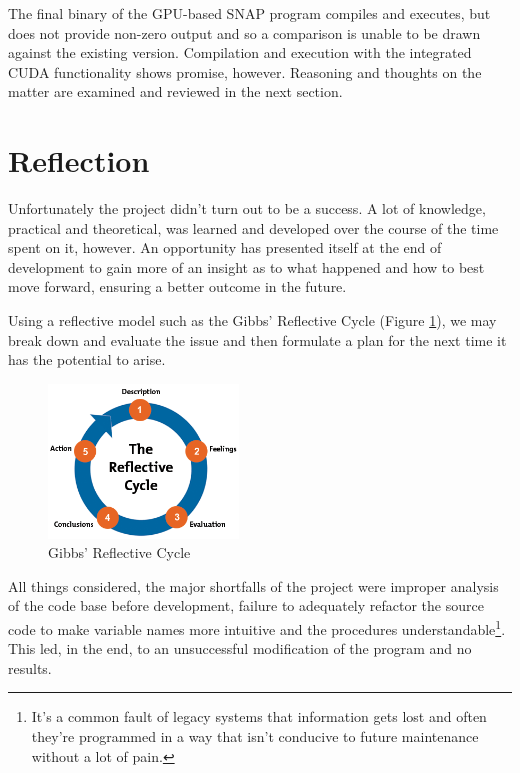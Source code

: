 \documentclass[conference]{IEEEtran}
\begin{document}
The final binary of the GPU-based SNAP program compiles and executes, but does not provide non-zero output and so a comparison is unable to be drawn against the existing version. Compilation and execution with the integrated CUDA functionality shows promise, however. Reasoning and thoughts on the matter are examined and reviewed in the next section.


\section{Reflection}
\label{sec:reflection}

Unfortunately the project didn't turn out to be a success. A lot of knowledge, practical and theoretical, was learned and developed over the course of the time spent on it, however. An opportunity has presented itself at the end of development to gain more of an insight as to what happened and how to best move forward, ensuring a better outcome in the future.

Using a reflective model such as the Gibbs' Reflective Cycle (Figure \ref{fig:gibbscycle}), we may break down and evaluate the issue and then formulate a plan for the next time it has the potential to arise.

\begin{figure}[!h]
    \centering
    \includegraphics[width=0.45\textwidth]{images/gibbs-cycle.png}
    \caption{Gibbs' Reflective Cycle}
    \label{fig:gibbscycle}
\end{figure}

All things considered, the major shortfalls of the project were improper analysis of the code base before development, failure to adequately refactor the source code to make variable names more intuitive and the procedures understandable\footnote{It's a common fault of legacy systems that information gets lost and often they're programmed in a way that isn't conducive to future maintenance without a lot of pain.}. This led, in the end, to an unsuccessful modification of the program and no results.
\end{document}
